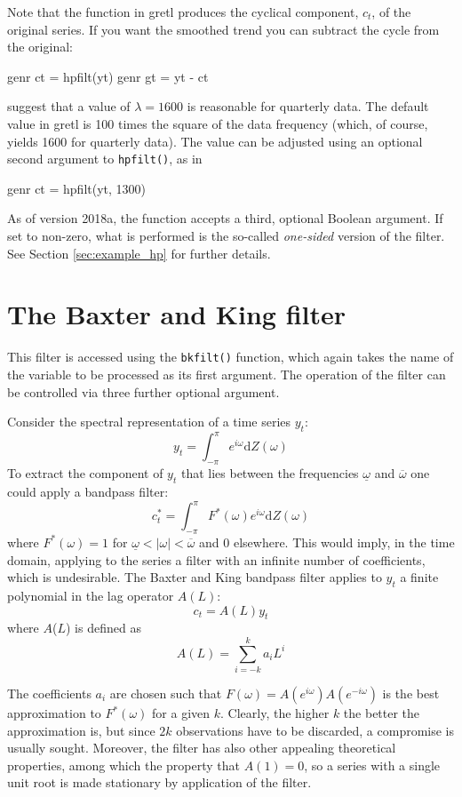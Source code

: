 Note that the  function in gretl produces the
cyclical component, $c_t$, of the original series.  If you want the
smoothed trend you can subtract the cycle from the original:

\begin{code}
genr ct = hpfilt(yt)
genr gt = yt - ct
\end{code}

\cite{hodrick97} suggest that a value of $\lambda = 1600$ is reasonable
for quarterly data.  The default value in gretl is 100 times the
square of the data frequency (which, of course, yields 1600 for
quarterly data).  The value can be adjusted using an optional
second argument to \verb+hpfilt()+, as in
%
\begin{code}
genr ct = hpfilt(yt, 1300)
\end{code}

As of version 2018a, the  function accepts a third,
optional Boolean argument. If set to non-zero, what is performed is
the so-called \emph{one-sided} version of the filter. See Section
\ref{sec:example_hp} for further details.

\section{The Baxter and King filter}
\label{sec:baxter-king}

This filter is accessed using the \verb+bkfilt()+ function, which
again takes the name of the variable to be processed as its first
argument. The operation of the filter can be controlled via three
further optional argument.

Consider the spectral representation of a time series $y_t$:
%       
\[ y_t = \int_{-\pi}^{\pi} e^{i\omega} \mathrm{d} Z(\omega) \]
%
To extract the component of $y_t$ that lies between the frequencies
$\underline{\omega}$ and $\overline{\omega}$ one could apply a
bandpass filter:
%       
\[ c^*_t = \int_{-\pi}^{\pi} F^*(\omega) e^{i\omega} \mathrm{d}
Z(\omega) \]
%
where $F^*(\omega) = 1$ for $\underline{\omega} < |\omega| <
\overline{\omega}$ and 0 elsewhere. This would imply, in the time
domain, applying to the series a filter with an infinite number of
coefficients, which is undesirable. The Baxter and King bandpass
filter applies to $y_t$ a finite polynomial in the lag
operator $A(L)$:
%       
\[ c_t = A(L) y_t \]
%
where $A$($L$) is defined as
%       
\[ A(L) = \sum_{i=-k}^{k} a_i L^i \]

The coefficients $a_i$ are chosen such that $F(\omega)
= A(e^{i\omega})A(e^{-i\omega})$ is the best approximation to
$F^*(\omega)$ for a given $k$. Clearly, the higher $k$ the better the
approximation is, but since $2k$ observations have to be discarded, a
compromise is usually sought. Moreover, the filter has also other
appealing theoretical properties, among which the property that $A(1)
= 0$, so a series with a single unit root is made stationary by
application of the filter.

